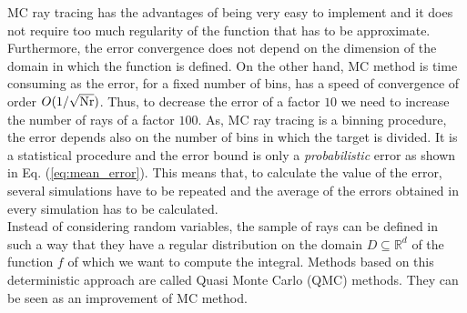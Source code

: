 MC ray tracing has the advantages of being very easy to implement and it does not require too much regularity of the function that has to be approximate. Furthermore, the error convergence does not depend on the dimension of the domain in which the function is defined.
On the other hand, MC method is time consuming as the error, for a fixed number of bins, has a speed of convergence of order $O(1/\sqrt{\textrm{Nr}})$. 
Thus, to decrease the error of a factor $10$ we need to increase the number of rays of a factor $100$.
As, MC ray tracing is a binning procedure, the error depends also on the number of bins in which the target is divided. It is a statistical procedure and the error bound is only a \emph{probabilistic} error as shown in Eq. (\ref{eq:mean_error}). This means that, to calculate the value of the error, several simulations have to be repeated and the average of the errors obtained in every simulation has to be calculated. \\ \indent 
Instead of considering random variables, the sample of rays can be defined in such a way that they have a regular distribution on the domain $D\subseteq\mathbb{R}^d$ of the function $f$ of which we want to compute the integral. Methods based on this deterministic approach are called Quasi Monte Carlo (QMC) methods. They can be seen as an improvement of MC method.

